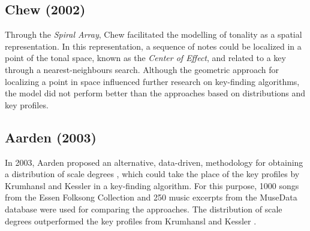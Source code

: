\subsection{Chew (2002)}



Through the \emph{Spiral Array}, Chew \cite{chew_spiral_2002} facilitated the modelling of tonality as a spatial representation. In this representation, a sequence of notes could be localized in a point of the tonal space, known as the \emph{Center of Effect}, and related to a key through a nearest-neighbours search. Although the geometric approach for localizing a point in space influenced further research on key-finding algorithms, the model did not perform better than the approaches based on distributions and key profiles.

\subsection{Aarden (2003)}

In 2003, Aarden proposed an alternative, data-driven, methodology for obtaining a distribution of scale degrees \cite{aarden_dynamic_2003}, which could take the place of the key profiles by Krumhansl and Kessler \cite{krumhansl_tracing_1982} in a key-finding algorithm. For this purpose, 1000 songs from the Essen Folksong Collection and 250 music excerpts from the MuseData database were used for comparing the approaches. The distribution of scale degrees outperformed the key profiles from Krumhansl and Kessler \cite{krumhansl_tracing_1982}. 


